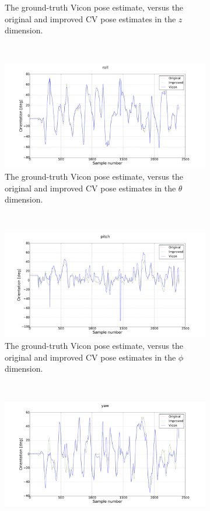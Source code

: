 \begin{figure}
\begin{subfigure}{0.45\textwidth}
    \caption{The ground-truth Vicon pose estimate, versus the original and improved CV pose estimates in the $z$ dimension.}
  \label{fig:estimate-z}
  \end{subfigure}
~
  \begin{subfigure}{0.45\textwidth}
    \includegraphics[width=\textwidth]{figures/chapter3/roll}
    \caption{The ground-truth Vicon pose estimate, versus the original and improved CV pose estimates in the $\theta$ dimension.}
  \label{fig:estimate-roll}
  \end{subfigure}
~
  \begin{subfigure}{0.45\textwidth}
    \includegraphics[width=\textwidth]{figures/chapter3/pitch}
    \caption{The ground-truth Vicon pose estimate, versus the original and improved CV pose estimates in the $\phi$ dimension.}
  \label{fig:estimate-pitch}
  \end{subfigure}
~
  \begin{subfigure}{0.45\textwidth}
    \includegraphics[width=\textwidth]{figures/chapter3/yaw}

\end{subfigure}
\end{figure}
